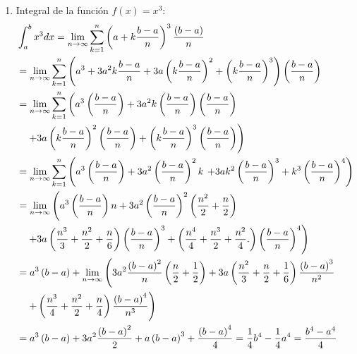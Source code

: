 \begin{enumerate}[leftmargin=1.2em,   itemindent=0pt,       labelwidth=\labelwidth,labelsep=0.5em,]
{\small
\begin{equation}\label{x2}
\text{\fbox{$\displaystyle{\int_{a}^{b}x^2\, dx=\frac{b^{3}-a^{3}}{3}}$}}
\end{equation}
}

\item { \textnormal{Integral de la función}} $f(x)=x^3$:
{\footnotesize
\begin{align*}
&\int_{a}^{b}x^{3}dx=\underset{n\rightarrow \infty }{\lim }\sum\limits_{k=1}^{n}\left( a+k\frac{b-a}{n}\right) ^{3}\frac{\left(
b-a\right) }{n}\\
&=\underset{n\rightarrow \infty }{\lim }\sum\limits_{k=1}^{n}
\left( a^{3}+3a^{2}k\frac{b-a}{n}+3a\left( k\frac{b-a}{n}\right) ^{2}
+\left( k\frac{b-a}{n}\right) ^{3}\right) \left( \frac{b-a}{n}\right)\\
&=\underset{n\rightarrow \infty }{\lim }\sum\limits_{k=1}^{n}%
\left( a^{3}\left( \frac{b-a}{n}\right) +3a^{2}k\left( \frac{b-a}{n}\right) \left( \frac{b-a}{n}\right)\right.\\
&\quad\left.+3a\left( k\frac{b-a}{n}\right) ^{2}\left( \frac{%
b-a}{n}\right) +\left( k\frac{b-a}{n}\right) ^{3}\left( \frac{b-a}{n}\right)
\right)\\
&=\underset{n\rightarrow \infty }{\lim }\sum\limits_{k=1}^{n}%
\left( a^{3}\left( \frac{b-a}{n}\right) +3a^{2}\left(
\frac{b-a}{n}\right)
^{2}k\right.%
\left.+3ak^{2}\left( \frac{b-a}{n}\right) ^{3}+k^{3}\left( \frac{b-a}{n}%
\right) ^{4}\right) \\
%
&=\underset{n\rightarrow \infty }{\lim }\left( a^{3}\left( \frac{b-a}{n}%
\right) n+3a^{2}\left( \frac{b-a}{n}\right) ^{2}\left( \frac{n^{2}}{2}+\frac{%
n}{2}\right)\right. \\
&\quad\left.+3a\left( \frac{n^{3}}{3}+\frac{n^{2}}{2}+\frac{n}{6}\right)
\left( \frac{b-a}{n}\right) ^{3}%
+\left( \frac{n^{4}}{4}+\frac{n^{3}}{2}+%
\frac{n^{2}}{4}.\right) \left( \frac{b-a}{n}\right) ^{4}\right)
\\
&=a^{3}\left( b-a\right) +\underset{n\rightarrow \infty }{\lim }\left( 3a^{2}\frac{\left( b-a\right) ^{2}}{n}\left(\frac{n}{2}+\frac{1}{2}\right)
+3a\left( \frac{n^{2}}{3}+\frac{n}{2}+\frac{1}{6}\right) \frac{\left(b-a\right) ^{3}}{n^{2}}\right. \\
&\quad\left.+\left( \frac{n^{3}}{4}+\frac{n^{2}}{2}+\frac{n}{4}%
\right) \frac{\left( b-a\right) ^{4}}{n^{3}}\right)\\
&=a^{3}\left( b-a\right) +3a^{2}\frac{\left( b-a\right) ^{2}}{2}+a\left(
b-a\right) ^{3}+\frac{\left( b-a\right) ^{4}}{4}%
=\allowbreak \frac{1}{4}
b^{4}-\frac{1}{4}a^{4}=\frac{b^{4}-a^{4}}{4}
\end{align*}
}


\end{enumerate}
